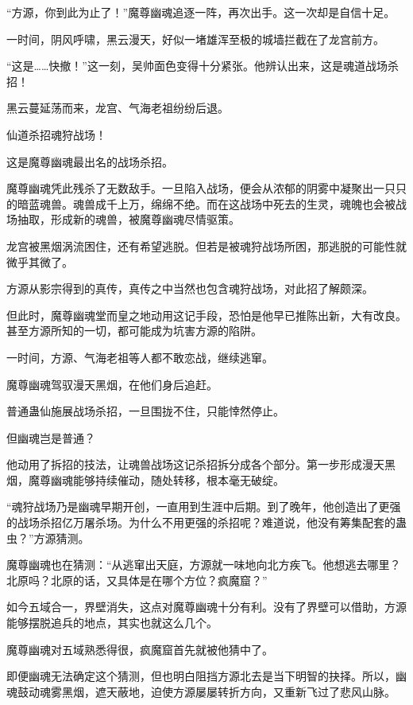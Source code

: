 
\begin{this_body}

“方源，你到此为止了！”魔尊幽魂追逐一阵，再次出手。这一次却是自信十足。

一时间，阴风呼啸，黑云漫天，好似一堵雄浑至极的城墙拦截在了龙宫前方。

“这是……快撤！”这一刻，吴帅面色变得十分紧张。他辨认出来，这是魂道战场杀招！

黑云蔓延荡而来，龙宫、气海老祖纷纷后退。

仙道杀招魂狩战场！

这是魔尊幽魂最出名的战场杀招。

魔尊幽魂凭此残杀了无数敌手。一旦陷入战场，便会从浓郁的阴雾中凝聚出一只只的暗蓝魂兽。魂兽成千上万，绵绵不绝。而在这战场中死去的生灵，魂魄也会被战场抽取，形成新的魂兽，被魔尊幽魂尽情驱策。

龙宫被黑烟涡流困住，还有希望逃脱。但若是被魂狩战场所困，那逃脱的可能性就微乎其微了。

方源从影宗得到的真传，真传之中当然也包含魂狩战场，对此招了解颇深。

但此时，魔尊幽魂堂而皇之地动用这记手段，恐怕是他早已推陈出新，大有改良。甚至方源所知的一切，都可能成为坑害方源的陷阱。

一时间，方源、气海老祖等人都不敢恋战，继续逃窜。

魔尊幽魂驾驭漫天黑烟，在他们身后追赶。

普通蛊仙施展战场杀招，一旦围拢不住，只能悻然停止。

但幽魂岂是普通？

他动用了拆招的技法，让魂兽战场这记杀招拆分成各个部分。第一步形成漫天黑烟，魔尊幽魂能够持续催动，随处转移，根本毫无破绽。

“魂狩战场乃是幽魂早期开创，一直用到生涯中后期。到了晚年，他创造出了更强的战场杀招亿万屠杀场。为什么不用更强的杀招呢？难道说，他没有筹集配套的蛊虫？”方源猜测。

魔尊幽魂也在猜测：“从逃窜出天庭，方源就一味地向北方疾飞。他想逃去哪里？北原吗？北原的话，又具体是在哪个方位？疯魔窟？”

如今五域合一，界壁消失，这点对魔尊幽魂十分有利。没有了界壁可以借助，方源能够摆脱追兵的地点，其实也就这么几个。

魔尊幽魂对五域熟悉得很，疯魔窟首先就被他猜中了。

即便幽魂无法确定这个猜测，但也明白阻挡方源北去是当下明智的抉择。所以，幽魂鼓动魂雾黑烟，遮天蔽地，迫使方源屡屡转折方向，又重新飞过了悲风山脉。


\end{this_body}
